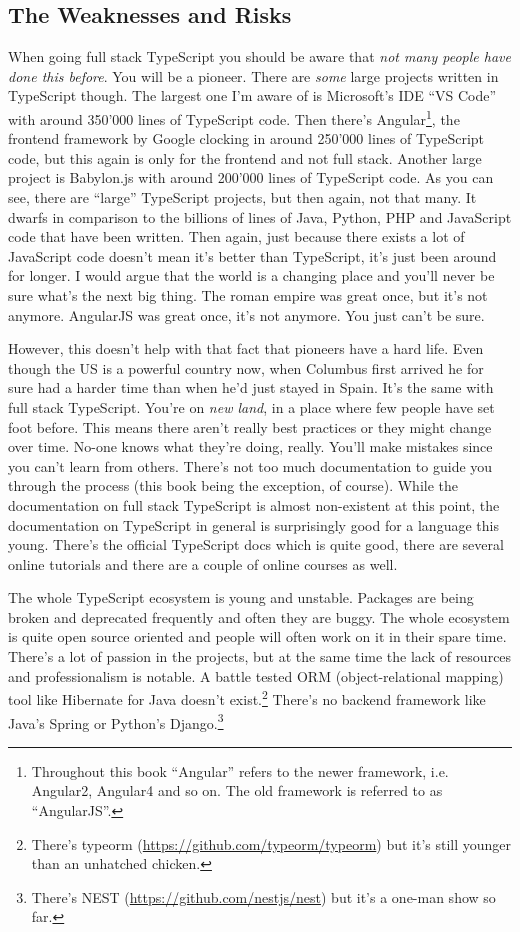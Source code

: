 \documentclass[12pt,a4paper]{report}
\begin{document}
\subsection{The Weaknesses and Risks}

When going full stack TypeScript you should be aware that \textit{not many people have done this before}. You will be a pioneer. There are \textit{some} large projects written in TypeScript though. The largest one I'm aware of is Microsoft's IDE ``VS Code'' with around 350'000 lines of TypeScript code. Then there's Angular\footnote{Throughout this book ``Angular'' refers to the newer framework, i.e. Angular2, Angular4 and so on. The old framework is referred to as ``AngularJS''.}, the frontend framework by Google clocking in around 250'000 lines of TypeScript code, but this again is only for the frontend and not full stack. Another large project is Babylon.js with around 200'000 lines of TypeScript code. As you can see, there are ``large'' TypeScript projects, but then again, not that many. It dwarfs in comparison to the billions of lines of Java, Python, PHP and JavaScript code that have been written. Then again, just because there exists a lot of JavaScript code doesn't mean it's better than TypeScript, it's just been around for longer. I would argue that the world is a changing place and you'll never be sure what's the next big thing. The roman empire was great once, but it's not anymore. AngularJS was great once, it's not anymore. You just can't be sure.

However, this doesn't help with that fact that pioneers have a hard life. Even though the US is a powerful country now, when Columbus first arrived he for sure had a harder time than when he'd just stayed in Spain. It's the same with full stack TypeScript. You're on \textit{new land}, in a place where few people have set foot before. This means there aren't really best practices or they might change over time. No-one knows what they're doing, really. You'll make mistakes since you can't learn from others. There's not too much documentation to guide you through the process (this book being the exception, of course). While the documentation on full stack TypeScript is almost non-existent at this point, the documentation on TypeScript in general is surprisingly good for a language this young. There's the official TypeScript docs which is quite good, there are several online tutorials and there are a couple of online courses as well.

The whole TypeScript ecosystem is young and unstable. Packages are being broken and deprecated frequently and often they are buggy. The whole ecosystem is quite open source oriented and people will often work on it in their spare time. There's a lot of passion in the projects, but at the same time the lack of resources and professionalism is notable. A battle tested ORM (object-relational mapping) tool like Hibernate for Java doesn't exist.\footnote{There's typeorm (\url{https://github.com/typeorm/typeorm}) but it's still younger than an unhatched chicken.} There's no backend framework like Java's Spring or Python's Django.\footnote{There's NEST (\url{https://github.com/nestjs/nest}) but it's a one-man show so far.}
\end{document}
